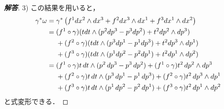 \documentclass[dvipdfmx,nosetpagesize, uplatex]{jsarticle}
\theoremstyle{definition}
\theoremstyle{StatementsWithStar}
\theoremstyle{StatementsWithStar2}
\theoremstyle{StatementsWithStar3}
\theoremstyle{StatementsWithCCirc}
\theoremstyle{definition}
\begin{document}
\begin{proof}[\bf{解答}]
3) この結果を用いると，
\begin{align*}
    \gamma^*\omega &= \gamma^*\left( f^1dx^2\wedge dx^3+f^2dx^3\wedge dx^1+f^3dx^1\wedge dx^2 \right) \\
    &= (f^1\circ\gamma) (tdt\wedge (p^2dp^3-p^3dp^2) + t^2dp^2\wedge dp^3) \\*
    &\hphantom{{}={}}+ (f^2\circ\gamma) (tdt\wedge (p^3dp^1-p^1dp^3) + t^2dp^3\wedge dp^1) \\*
    &\hphantom{{}={}}+ (f^3\circ\gamma) (tdt\wedge (p^1dp^2-p^2dp^1) + t^2dp^1\wedge dp^2) \\
    &=(f^1\circ\gamma)t\,dt\wedge(p^2\,dp^3-p^3\,dp^2)+(f^1\circ\gamma)t^2\,dp^2\wedge dp^3\\*
    &\hphantom{{}={}}+(f^2\circ\gamma)t\,dt\wedge(p^3\,dp^1-p^1\,dp^3)+(f^2\circ\gamma)t^2\,dp^3\wedge dp^1\\*
    &\hphantom{{}={}}+(f^3\circ\gamma)t\,dt\wedge(p^1\,dp^2-p^2\,dp^1)+(f^3\circ\gamma)t^2\,dp^1\wedge dp^2
\end{align*}
と式変形できる．


\end{proof}
\end{document}
